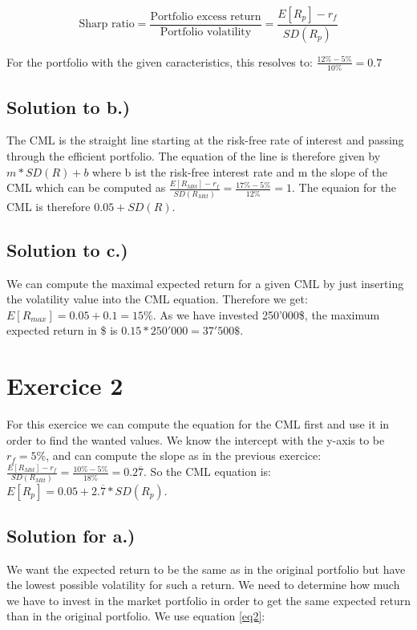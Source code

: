 \documentclass[a4paper,11pt,twoside]{article}
\begin{document}
\begin{equation}
\label{eq1}
\text{Sharp ratio} = \frac{\text{Portfolio excess return}}{\text{Portfolio volatility}} = \frac{E[R_p]-r_f}{SD(R_p)}
\end{equation}

For the portfolio with the given caracteristics, this resolves to: $\frac{12\% - 5\%}{10\%} = 0.7$

\subsection{Solution to b.)}

The CML is the straight line starting at the risk-free rate of interest and passing through the efficient portfolio. The equation of the line is therefore given by $m*SD(R)+b$ where b ist the risk-free interest rate and m the slope of the CML which can be computed as $\frac{E[R_{Mkt}]-r_f}{SD(R_{Mkt})} = \frac{17\%-5\%}{12\%} = 1$. The equaion for the CML is therefore $0.05+SD(R)$.

\subsection{Solution to c.)}

We can compute the maximal expected return for a given CML by just inserting the volatility value into the CML equation. Therefore we get: $E[R_{max}] = 0.05+0.1 = 15\%$. As we have invested 250'000\$, the maximum expected return in \$ is $0.15*250'000 = 37'500\$ $.


\section{Exercice 2}

For this exercice we can compute the equation for the CML first and use it in order to find the wanted values. We know the intercept with the y-axis to be $r_f = 5\%$, and can compute the slope as in the previous exercice: $\frac{E[R_{Mkt}]-r_f}{SD(R_{Mkt})} = \frac{10\%-5\%}{18\%} = 0.2\overline{7}$. So the CML equation is: $E[R_p] = 0.05+2.\overline{7}*SD(R_p)$.

\subsection{Solution for a.)}

We want the expected return to be the same as in the original portfolio but have the lowest possible volatility for such a return. We need to determine how much we have to invest in the market portfolio in order to get the same expected return than in the original portfolio. We use equation \ref{eq2}:
\end{document}
